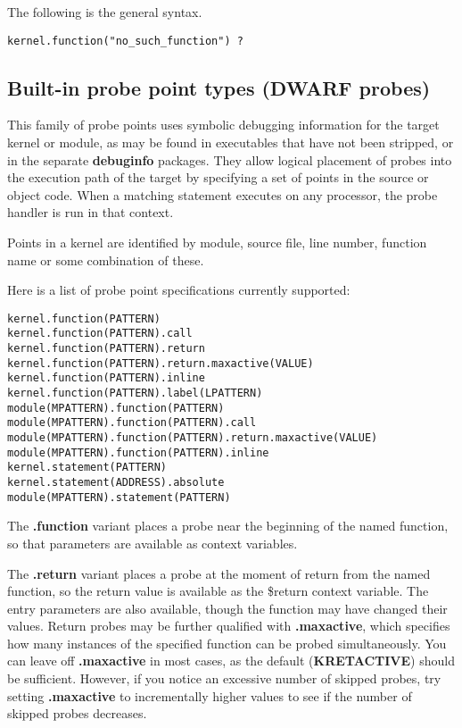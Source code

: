 \documentclass[twoside,english]{article}
\newenvironment{vindent}
{\begin{list}{}{\setlength{\listparindent}{6pt}}
\item[]}
{\end{list}}
\begin{document}
The following is the general syntax.

\begin{vindent}
\begin{verbatim}
kernel.function("no_such_function") ?
\end{verbatim}
\end{vindent}

\subsection{Built-in probe point types (DWARF probes)}
\label{dwarfprobes}
This family of probe points uses symbolic debugging information for the target
kernel or module, as may be found in executables that have not
been stripped, or in the separate \textbf{debuginfo} packages. They allow
logical placement of probes into the execution path of the target
by specifying a set of points in the source or object code. When a matching
statement executes on any processor, the probe handler is run in that context.

Points in a kernel are identified by module, source file, line number, function
name or some combination of these.

Here is a list of probe point specifications currently supported:

\begin{vindent}
\begin{verbatim}
kernel.function(PATTERN)
kernel.function(PATTERN).call
kernel.function(PATTERN).return
kernel.function(PATTERN).return.maxactive(VALUE)
kernel.function(PATTERN).inline
kernel.function(PATTERN).label(LPATTERN)
module(MPATTERN).function(PATTERN)
module(MPATTERN).function(PATTERN).call
module(MPATTERN).function(PATTERN).return.maxactive(VALUE)
module(MPATTERN).function(PATTERN).inline
kernel.statement(PATTERN)
kernel.statement(ADDRESS).absolute
module(MPATTERN).statement(PATTERN)
\end{verbatim}
\end{vindent}

The \textbf{.function} variant places a probe near the beginning of the named
function, so that parameters are available as context variables.

The \textbf{.return} variant places a probe at the moment of return from the named
function, so the return value is available as the \$return context variable.
The entry parameters are also available, though the function may have changed
their values.  Return probes may be further qualified with \textbf{.maxactive},
which specifies how many instances of the specified function can be probed simultaneously.
You can leave off \textbf{.maxactive} in most cases, as the default
(\textbf{KRETACTIVE}) should be sufficient.
However, if you notice an excessive number of skipped probes, try setting \textbf{.maxactive}
to incrementally higher values to see if the number of skipped probes decreases.
\end{document}
